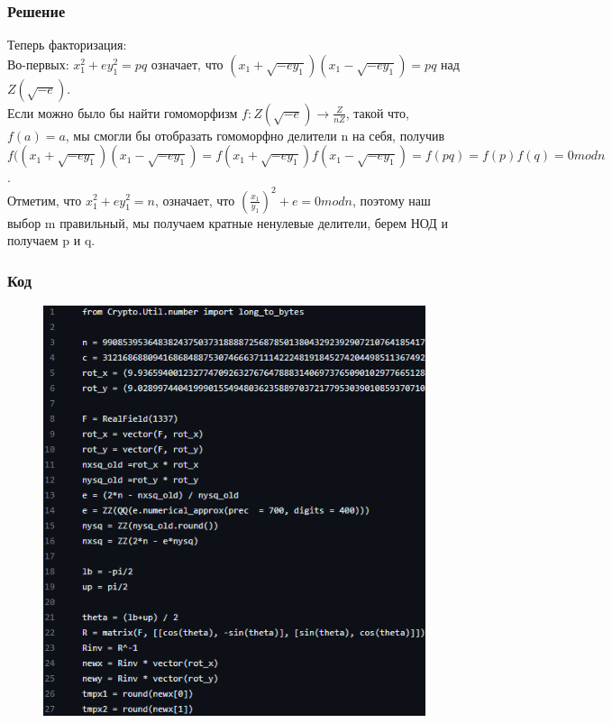 \documentclass[t]{beamer}
\begin{document}
\begin{frame}[c]
	\frametitle{Решение} 
		 \begin{block}{}
		     {Теперь факторизация: \\ Во-первых: \(x_1^2 + ey_1^2 = pq\) означает, что \((x_1 + \sqrt{-ey_1})(x_1 - \sqrt{-ey_1}) = pq\) над \(Z(\sqrt{-e})\). \\ Если можно было бы найти гомоморфизм \(f : Z(\sqrt{-e}) \rightarrow \frac{Z}{nZ}\), такой что, \(f(a) = a\), мы смогли бы отобразать гомоморфно делители n на себя, получив \(f((x_1 + \sqrt{-ey_1})(x_1 - \sqrt{-ey_1}) = f(x_1 + \sqrt{-ey_1})f(x_1 - \sqrt{-ey_1}) = f(pq) = f(p)f(q) = 0 mod n\). \\ Отметим, что \(x_1^2 + ey_1^2 = n\), означает, что \((\frac{x_1}{y_1})^2 + e = 0 mod n\), поэтому наш выбор m правильный, мы получаем кратные ненулевые делители, берем НОД и получаем p и q.}
          \end{block}
\end{frame}

\begin{frame}
	\frametitle{Код}
		\begin{figure}
		     \centering
		     \includegraphics[width=0.6\linewidth]{Code1.png}
		     \label{fig:my_label}
		 \end{figure}
\end{frame}
\end{document}
